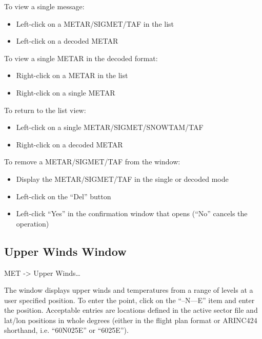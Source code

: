 \documentclass[a4paper,oneside,11pt]{memoir}
\begin{document}
\bigskip

To view a single message:

\begin{itemize}
    \item Left-click on a METAR/SIGMET/TAF in the list
    \item Left-click on a decoded METAR
\end{itemize}

\bigskip

To view a single METAR in the decoded format:

\begin{itemize}
    \item Right-click on a METAR in the list
    \item Right-click on a single METAR
\end{itemize}

\bigskip

To return to the list view:

\begin{itemize}
    \item Left-click on a single METAR/SIGMET/SNOWTAM/TAF
    \item Right-click on a decoded METAR
\end{itemize}

\bigskip

To remove a METAR/SIGMET/TAF from the window:

\begin{itemize}
    \item Display the METAR/SIGMET/TAF in the single or decoded mode
    \item Left-click on the “Del” button
    \item Left-click “Yes” in the confirmation window that opens (“No” cancels the operation)
\end{itemize}

\subsection{Upper Winds Window}\label{win:uww}

 MET -> Upper Winds…


The window displays upper winds and temperatures from a range of levels at a user specified position. To enter the point, click on the “--N---E” item and enter the position. Acceptable entries are locations defined in the active sector file and lat/lon positions in whole degrees (either in the flight plan format or ARINC424 shorthand, i.e. “60N025E” or “6025E”).
\end{document}
